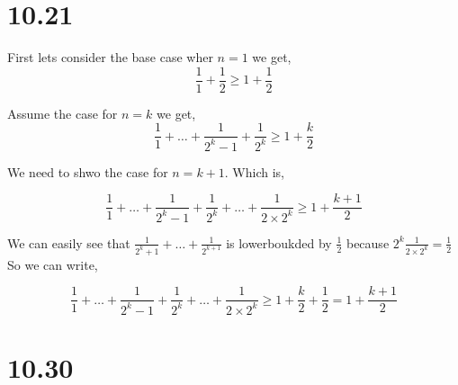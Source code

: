 \documentclass[a4paper]{report}
\begin{document}
\section*{10.21}
First lets consider the base case wher $n = 1$ we get,  
$$ \frac{1}{1} + \frac{1}{2} \ge   1 + \frac{1}{2} $$ 

Assume the case for $n = k$ we get,  
$$ \frac{1}{1} + \dots + \frac{1}{2^k - 1} + \frac{1}{2^{k}} \ge 1 + \frac{k}{2} $$ 

We need to shwo the case for $n = k + 1$.  Which is, 

$$ \frac{1}{1} + \dots + \frac{1}{2^k - 1} + \frac{1}{2^{k}} + \dots + \frac{1}{2 \times  2^k } \ge 1 + \frac{k + 1}{2} $$ 

We can easily see that $\frac{1}{2^k + 1} + \dots + \frac{1}{2^{k + 1}}$ is lowerboukded by $\frac{1}{2}$ because $2^k \frac{1}{2 \times 2^k} = \frac{1}{2}$ So we can write, 

$$ \frac{1}{1} + \dots + \frac{1}{2^k - 1} + \frac{1}{2^{k}} + \dots + \frac{1}{2 \times  2^k } \ge 1 + \frac{k}{2} + \frac{1}{2} =1 + \frac{k +1}{2} $$ 


\section*{10.30}
\end{document}
